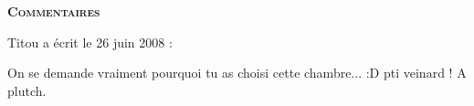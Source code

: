 \bigskip
\textbf{\textsc{Commentaires}}

\medskip
Titou a écrit le 26 juin 2008 :
\begin{displayquote}
On se demande vraiment pourquoi tu as choisi cette chambre... :D pti veinard !
A plutch.
\end{displayquote}

\vfill
